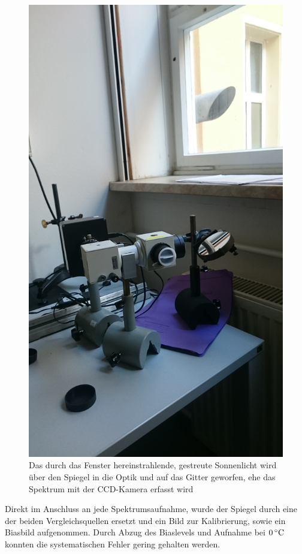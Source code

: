 			\begin{figure}
				\center
				\includegraphics[scale=0.085]{messwerte/Handybilder/DSC_0694.JPG}
				\caption{Das durch das Fenster hereinstrahlende, gestreute Sonnenlicht wird über den Spiegel in die Optik und auf das Gitter geworfen, ehe das Spektrum mit der CCD-Kamera erfasst wird}
				\label{spiegel_und_sonne}
			\end{figure}

			Direkt im Anschluss an jede Spektrumsaufnahme, wurde der Spiegel durch eine der beiden Vergleichsquellen ersetzt und ein Bild zur Kalibrierung, sowie ein Biasbild aufgenommen.
			Durch Abzug des Biaslevels und Aufnahme bei $0\, \text{$^\circ$C}$ konnten die systematischen Fehler gering gehalten werden.





